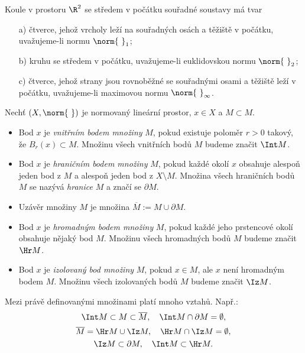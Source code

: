 \begin{ex}
Koule v prostoru $\R^2$ se středem v počátku souřadné soustavy má tvar
\begin{itemize}
\item[a)] čtverce, jehož vrcholy leží na souřadných osách a těžiště v počátku, uvažujeme-li normu $\norm{\ }_1$;
\item[b)] kruhu se středem v počátku, uvažujeme-li euklidovskou normu $\norm{\ }_2$;
\item[c)] čtverce, jehož strany jsou rovnoběžné se souřadnými osami a těžiště leží v počátku, uvažujeme-li maximovou normu $\norm{\ }_\infty$.
\end{itemize}
\end{ex}

\begin{df}
Nechť $(X,\norm{\ })$ je normovaný lineární prostor, $x\in X$ a $M\subset M$.
\begin{itemize}
\item Bod $x$ je \emph{vnitřním bodem množiny} $M$, pokud existuje poloměr $r>0$ takový, že $B_r(x)\subset M$.
Množinu všech vnitřních bodů $M$ budeme značit $\Int M$.
\item Bod $x$ je \emph{hraničním bodem množiny} $M$, pokud každé okolí $x$ obsahuje alespoň jeden bod z $M$ a alespoň jeden bod z $X\setminus M$.
Množina všech hraničních bodů $M$ se nazývá \emph{hranice} $M$ a značí se $\partial M$.
\item Uzávěr množiny $M$ je množina $\overline M:=M\cup\partial M$.
\item Bod $x$ je \emph{hromadným bodem množiny} $M$, pokud každé jeho prstencové okolí obsahuje nějaký bod $M$.
Množinu všech hromadných bodů $M$ budeme značit $\Hr M$.
\item Bod $x$ je \emph{izolovaný bod množiny} $M$, pokud $x\in M$, ale $x$ není hromadným bodem $M$.
Množinu všech izolovaných bodů $M$ budeme značit $\Iz M$.
\end{itemize}
\end{df}

Mezi právě definovanými množinami platí mnoho vztahů. Např.:
\[ \Int M\subset M \subset \overline M, \quad \Int M\cap \partial M = \emptyset, \]
\[ \overline M = \Hr M \cup \Iz M, \quad \Hr M \cap \Iz M = \emptyset, \]
\[ \Iz M \subset \partial M, \quad \Int M \subset \Hr M. \]



